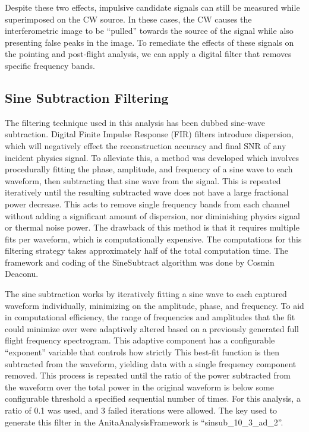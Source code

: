 	
	Despite these two effects, impulsive candidate signals can still be measured while superimposed on the CW source.  In these cases, the CW causes the interferometric image to be ``pulled'' towards the source of the signal while also presenting false peaks in the image.  To remediate the effects of these signals on the pointing and post-flight analysis, we can apply a digital filter that removes specific frequency bands.
	
	
	\subsection{Sine Subtraction Filtering}
		The filtering technique used in this analysis has been dubbed sine-wave subtraction.  Digital Finite Impulse Response (FIR) filters introduce dispersion, which will negatively effect the reconstruction accuracy and final SNR of any incident physics signal.  To alleviate this, a method was developed which involves procedurally fitting the phase, amplitude, and frequency of a sine wave to each waveform, then subtracting that sine wave from the signal.  This is repeated iteratively until the resulting subtracted wave does not have a large fractional power decrease.  This acts to remove single frequency bands from each channel without adding a significant amount of dispersion, nor diminishing physics signal or thermal noise power.  The drawback of this method is that it requires multiple fits per waveform, which is computationally expensive.  The computations for this filtering strategy takes approximately half of the total computation time.  The framework and coding of the SineSubtract algorithm was done by Cosmin Deaconu.  

	The sine subtraction works by iteratively fitting a sine wave to each captured waveform individually, minimizing on the amplitude, phase, and frequency.   To aid in computational efficiency, the range of frequencies and amplitudes that the fit could minimize over were adaptively altered based on a previously generated full flight frequency spectrogram.  This adaptive component has a configurable ``exponent'' variable that controls how strictly   This best-fit function is then subtracted from the waveform, yielding data with a single frequency component removed.  This process is repeated until the ratio of the power subtracted from the waveform over the total power in the original waveform is below some configurable threshold a specified sequential number of times.  For this analysis, a ratio of 0.1 was used, and 3 failed iterations were allowed.  The key used to generate this filter in the AnitaAnalysisFramework is ``sinsub\_10\_3\_ad\_2''.  
	
